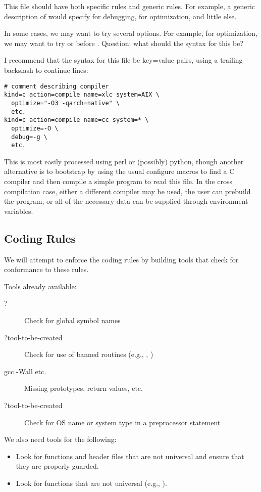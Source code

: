 \documentclass{article}
\begin{document}
This file should have both specific rules and generic rules.  For
example, a generic description of  would specify 
for debugging,  for optimization, and little else.  

In some cases, we may want to try several options.  For example, for
optimization, we may want to try  or  before .
Question:
what should the syntax for this be?

I recommend that the syntax for this file be key=value pairs, using a
trailing backslash to continue lines:
\begin{verbatim}
# comment describing compiler
kind=c action=compile name=xlc system=AIX \
  optimize="-O3 -qarch=native" \
  etc.
kind=c action=compile name=cc system=* \
  optimize=-O \
  debug=-g \
  etc.
\end{verbatim}
This is most easily processed using perl or (possibly) python, though
another alternative is to bootstrap by using the usual configure
macros to find a C compiler and then compile a simple program to read
this file.  In the cross compilation case, either a different compiler
may be used, the user can prebuild the program, or all of the
necessary data can be supplied through environment variables.

\subsection{Coding Rules}
We will attempt to enforce the coding rules by building tools that
check for conformance to these rules.

Tools already available:
\begin{description}
\item[?]Check for global symbol names
\item[?tool-to-be-created]Check for use of banned routines (e.g., ,
)
\item[gcc -Wall etc.]Missing prototypes, return values, etc.
\item[?tool-to-be-created]Check for OS name or system type in a preprocessor statement
\end{description}

We also need tools for the following:
\begin{itemize}
\item Look for functions and header files that are not universal and
ensure that they are properly guarded.
\item Look for functions that are not universal (e.g., ).
\end{itemize}
\end{document}

